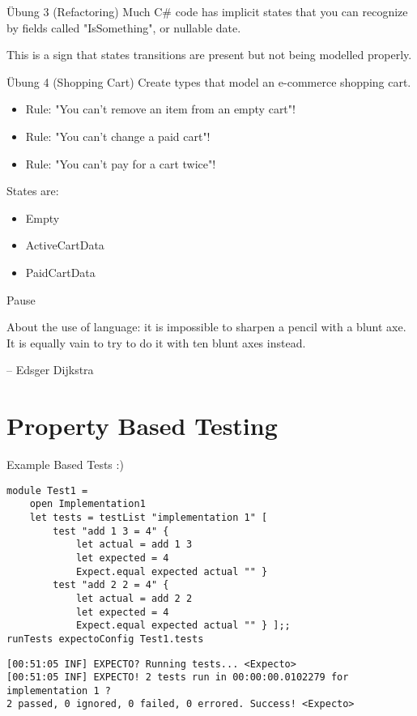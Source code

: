 \documentclass[t]{beamer}
\begin{document}
\begin{frame}[label={sec:org00fbc34}]{Übung 3 (Refactoring)}
Much C\# code has implicit states that you can recognize by fields called "IsSomething", or nullable date.

This is a sign that states transitions are present but not being modelled properly.
\end{frame}

\begin{frame}[label={sec:orgb3a36ec}]{Übung 4 (Shopping Cart)}
Create types that model an e-commerce shopping cart.

\begin{itemize}
\item Rule: "You can't remove an item from an empty cart"!
\item Rule: "You can't change a paid cart"!
\item Rule: "You can't pay for a cart twice"!
\end{itemize}

States are:
\begin{itemize}
\item Empty
\item ActiveCartData
\item PaidCartData
\end{itemize}
\end{frame}

\begin{frame}[label={sec:org2f3347b}]{Pause}
\begin{block}{}
About the use of language: it is impossible to sharpen a pencil with a blunt axe. 
It is equally vain to try to do it with ten blunt axes instead.

\null\hfill -- Edsger Dijkstra
\end{block}
\end{frame}

\section{Property Based Testing }
\label{sec:org368d605}
\begin{frame}[label={sec:orgf3046ef},fragile]{Example Based Tests :)}
 \begin{verbatim}
module Test1 =
    open Implementation1
    let tests = testList "implementation 1" [
        test "add 1 3 = 4" {
            let actual = add 1 3
            let expected = 4
            Expect.equal expected actual "" }
        test "add 2 2 = 4" {
            let actual = add 2 2
            let expected = 4
            Expect.equal expected actual "" } ];;
runTests expectoConfig Test1.tests
\end{verbatim}

\begin{verbatim}
[00:51:05 INF] EXPECTO? Running tests... <Expecto>
[00:51:05 INF] EXPECTO! 2 tests run in 00:00:00.0102279 for implementation 1 ? 
2 passed, 0 ignored, 0 failed, 0 errored. Success! <Expecto>
\end{verbatim}
\end{frame}
\end{document}
